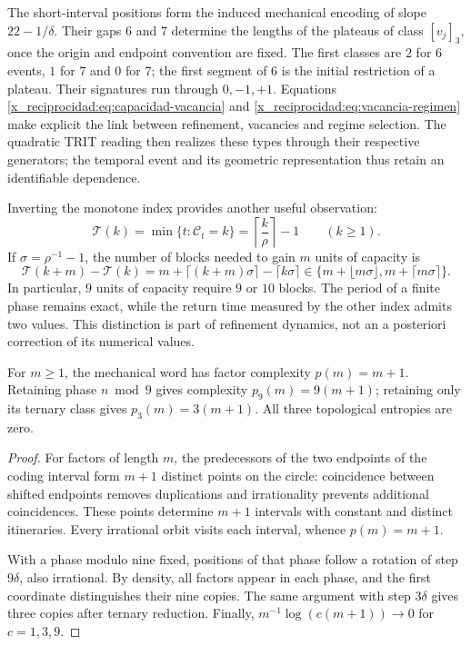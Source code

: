The short-interval positions form the induced mechanical encoding
of slope \(22-1/\delta\). Their gaps \(6\) and \(7\)
determine the lengths of the plateaus of class \([v_j]_3\), once
the origin and endpoint convention are fixed. The first classes
are \(2\) for \(6\) events, \(1\) for \(7\) and \(0\) for
\(7\); the first segment of \(6\) is the initial restriction of a plateau.
Their signatures run through \(0,-1,+1\). Equations
\eqref{x_reciprocidad:eq:capacidad-vacancia} and \eqref{x_reciprocidad:eq:vacancia-regimen} make explicit the
link between refinement, vacancies and regime selection. The quadratic
TRIT reading then realizes these types through their respective
generators; the temporal event and its geometric representation
thus retain an identifiable dependence.

Inverting the monotone index provides another useful observation:
\[
 \mathcal T(k)=\min\{t:\mathcal C_t=k\}
   =\left\lceil\frac k\rho\right\rceil-1\qquad(k\geq1).
\]
If \(\sigma=\rho^{-1}-1\), the number of blocks needed to gain
\(m\) units of capacity is
\[
 \mathcal T(k+m)-\mathcal T(k)
 =m+\lceil(k+m)\sigma\rceil-\lceil k\sigma\rceil
 \in\{m+\lfloor m\sigma\rfloor,m+\lceil m\sigma\rceil\}.
\]
In particular, \(9\) units of capacity require \(9\) or \(10\)
blocks. The period of a finite phase remains exact, while the
return time measured by the other index admits two values. This
distinction is part of refinement dynamics, not an a posteriori correction
of its numerical values.



\begin{theorem}
For \(m\ge1\), the mechanical word has factor complexity \(p(m)=m+1\). Retaining phase \(n\bmod9\) gives complexity \(p_9(m)=9(m+1)\); retaining only its ternary class gives \(p_3(m)=3(m+1)\). All three topological entropies are zero.
\end{theorem}
\begin{proof}
For factors of length \(m\), the predecessors of the two endpoints of the coding interval form \(m+1\) distinct points on the circle: coincidence between shifted endpoints removes duplications and irrationality prevents additional coincidences. These points determine \(m+1\) intervals with constant and distinct itineraries. Every irrational orbit visits each interval, whence \(p(m)=m+1\).

With a phase modulo nine fixed, positions of that phase follow a rotation of step \(9\delta\), also irrational. By density, all factors appear in each phase, and the first coordinate distinguishes their nine copies. The same argument with step \(3\delta\) gives three copies after ternary reduction. Finally, \(m^{-1}\log(c(m+1))\to0\) for \(c=1,3,9\).
\end{proof}

